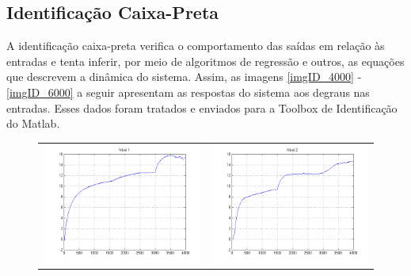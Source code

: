 \subsection{Identificação Caixa-Preta}
A identificação caixa-preta verifica o comportamento das saídas em relação às entradas e tenta inferir, por meio de algoritmos de regressão e outros, as equações que descrevem a dinâmica do sistema. Assim, as imagens \ref{imgID_4000} - \ref{imgID_6000} a seguir apresentam as respostas do sistema aos degraus nas entradas. Esses dados foram tratados e enviados para a Toolbox de Identificação do Matlab. 
\begin{figure}[H]
	\centering
	\begin{tabular}{cc}
		\includegraphics[height=0.15\paperheight,keepaspectratio]{img/sim1_h1.png} &
		\includegraphics[height=0.15\paperheight,keepaspectratio]{img/sim1_h2.png} \\

\end{tabular}
\end{figure}
